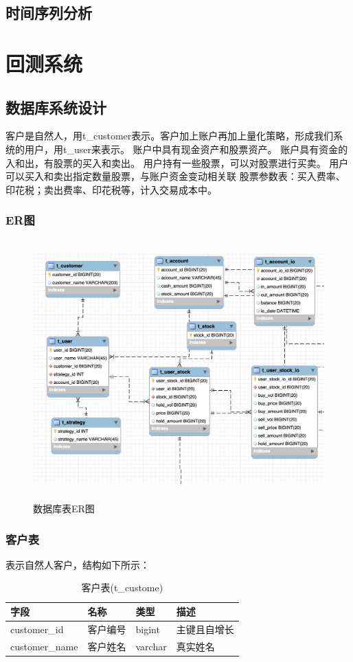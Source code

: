 \documentclass{article}
\begin{document}
\subsection{时间序列分析}
\section{回测系统}
\subsection{数据库系统设计}
客户是自然人，用t\_customer表示。客户加上账户再加上量化策略，形成我们系统的用户，用t\_user来表示。
账户中具有现金资产和股票资产。
账户具有资金的入和出，有股票的买入和卖出。
用户持有一些股票，可以对股票进行买卖。
用户可以买入和卖出指定数量股票，与账户资金变动相关联
股票参数表：买入费率、印花税；卖出费率、印花税等，计入交易成本中。
\subsubsection{ER图}
\begin{figure}[H]
	\caption{数据库表ER图}
	\label{f000001}
	\centering
	\includegraphics[height=10cm]{images/f000001}
\end{figure}
\subsubsection{客户表}
表示自然人客户，结构如下所示：
\begin{table}[H]
    \caption{客户表(t\_custome)}
    \label{t000001}
    \begin{tabular}{|p{2cm}|p{3cm}|p{2cm}|p{5cm}|} \hline
        字段 & 名称 & 类型 & 描述 \\ \hline 
        customer\_id & 客户编号 & bigint & 主键且自增长 \\ \hline
        customer\_name & 客户姓名 & varchar & 真实姓名 \\ \hline
    \end{tabular}
\end{table}
\end{document}
